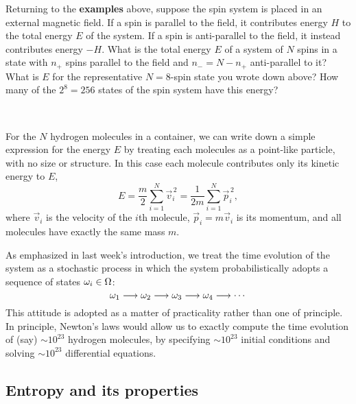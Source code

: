 \newpage %
Returning to the \textbf{examples} above, suppose the spin system is placed in an external magnetic field.
If a spin is parallel to the field, it contributes energy $H$ to the total energy $E$ of the system.
If a spin is anti-parallel to the field, it instead contributes energy $-H$.
What is the total energy $E$ of a system of $N$ spins in a state with $n_+$ spins parallel to the field and $n_- = N - n_+$ anti-parallel to it?
What is $E$ for the representative $N = 8$-spin state you wrote down above?
How many of the $2^8 = 256$ states of the spin system have this energy?
\begin{mdframed}
  \ \\[100 pt]
\end{mdframed}
For the $N$ hydrogen molecules in a container, we can write down a simple expression for the energy $E$ by treating each molecules as a point-like particle, with no size or structure.
In this case each molecule contributes only its kinetic energy to $E$,
\begin{equation*}
  E = \frac{m}{2} \sum_{i = 1}^N \vec{v}_i^{\,2} = \frac{1}{2m} \sum_{i = 1}^N \vec{p}_i^{\,2},
\end{equation*}
where $\vec v_i$ is the velocity of the $i$th molecule, $\vec p_i = m \vec v_i$ is its momentum, and all molecules have exactly the same mass $m$.

As emphasized in last week's introduction, we treat the time evolution of the system as a stochastic process in which the system probabilistically adopts a sequence of states $\omega_i \in \Omega$:
\begin{equation*}
  \omega_1 \longrightarrow \omega_2 \longrightarrow \omega_3 \longrightarrow \omega_4 \longrightarrow \cdots
\end{equation*}
This attitude is adopted as a matter of practicality rather than one of principle.
In principle, Newton's laws would allow us to exactly compute the time evolution of (say) $\sim$$10^{23}$ hydrogen molecules, by specifying $\sim$$10^{23}$ initial conditions and solving $\sim$$10^{23}$ differential equations.



\newpage %
\subsection{Entropy and its properties}



